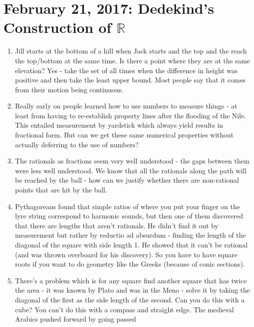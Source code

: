 \documentclass[12pt]{article}
\theoremstyle{definition}
\begin{document}
\section{February 21, 2017: Dedekind's Construction of $\mathbb{R}$}

\begin{enumerate}
    \itemsep0em 
    \item  
        Jill starts at the bottom of a hill when Jack starts and the top and
        the reach the top/bottom at the same time. Is there a point where they
        are at the same elevation? Yes - take the set of all times when the
        difference in height was positive and then take the least upper bound.
        Most people say that it comes from their motion being continuous.
    \item
        Really early on people learned how to use numbers to measure things -
        at least from having to re-establish property lines after the flooding
        of the Nile. This entailed measurement by yardstick which always yield
        results in fractional form. But can we get these same numerical
        properties without actually deferring to the use of numbers? 
    \item
        The rationals as fractions seem very well understood - the gaps between
        them were less well understood. We know that all the rationals along
        the path will be reached by the ball - how can we justify whether there
        are non-rational points that are hit by the ball.
    \item
        Pythagoreans found that simple ratios of where you put your finger on
        the lyre string correspond to harmonic sounds, but then one of them
        discovered that there are lengths that aren't rationals. He
        didn't find it out by measurement but rather by reductio ad absurdum -
        finding the length of the diagonal of the square with side length 1. He
        showed that it can't be rational (and was thrown overboard for his
        discovery). So you have to have square roots if you want to do geometry
        like the Greeks (because of conic sections).
    \item
        There's a problem which is for any square find another square that has
        twice the area - it was known by Plato and was in the Meno - solve it
        by taking the diagonal of the first as the side length of the second.
        Can you do this with a cube? You can't do this with a compass and
        straight edge. The medieval Arabics pushed forward by going passed

\end{enumerate}
\end{document}
